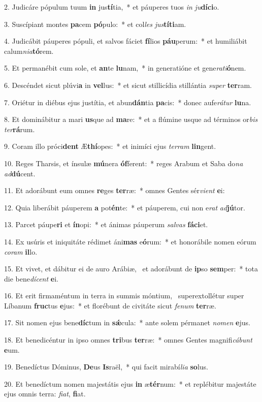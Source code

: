 2. Judicáre pópulum tuum \textbf{in} jus\textbf{tí}tia,~*  et páuperes tuos \textit{in} \textit{ju}\textbf{dí}\textbf{ci}o.\

3. Suscípiant montes \textbf{pa}cem \textbf{pó}pulo:~*  et col\textit{les} \textit{jus}\textbf{tí}\textbf{ti}am.\

4. Judicábit páuperes pópuli, et salvos fáciet \textbf{fí}lios \textbf{páu}perum:~*  et humiliábit calum\textit{ni}\textit{a}\textbf{tó}rem.\

5. Et permanébit cum sole, et \textbf{an}te \textbf{lu}nam,~*  in generatióne et gene\textit{ra}\textit{ti}\textbf{ó}nem.\

6. Descéndet sicut plúvi\textbf{a} in \textbf{vel}lus:~*  et sicut stillicídia stillántia \textit{su}\textit{per} \textbf{ter}ram.\

7. Oriétur in diébus ejus justítia, et abun\textbf{dán}tia \textbf{pa}cis:~*  donec aufe\textit{rá}\textit{tur} \textbf{lu}na.\

8. Et dominábitur a mari \textbf{us}que ad \textbf{ma}re:~*  et a flúmine usque ad términos or\textit{bis} \textit{ter}\textbf{rá}rum.\

9. Coram illo próci\textbf{dent} Æ\textbf{thí}opes:~*  et inimíci ejus \textit{ter}\textit{ram} \textbf{lin}gent.\

10. Reges Tharsis, et ínsulæ \textbf{mú}nera \textbf{óf}ferent:~*  reges Arabum et Saba do\textit{na} \textit{ad}\textbf{dú}cent.\

11. Et adorábunt eum omnes \textbf{re}ges \textbf{ter}ræ:~*  omnes Gentes sér\textit{vi}\textit{ent} \textbf{e}i:\

12. Quia liberábit páuperem \textbf{a} pot\textbf{én}te:~*  et páuperem, cui non e\textit{rat} \textit{ad}\textbf{jú}tor.\

13. Parcet páupe\textbf{ri} et \textbf{ín}opi:~*  et ánimas páuperum \textit{sal}\textit{vas} \textbf{fá}\textbf{ci}et.\

14. Ex usúris et iniquitáte rédimet áni\textbf{mas} e\textbf{ó}rum:~*  et honorábile nomen eórum \textit{co}\textit{ram} \textbf{il}lo.\

15. Et vivet, et dábitur ei de auro Arábiæ, \dag\  et adorábunt de \textbf{ip}so \textbf{sem}per:~*  tota die bene\textit{dí}\textit{cent} \textbf{e}i.\

16. Et erit firmaméntum in terra in summis móntium, \dag\  superextollétur super Líbanum \textbf{fruc}tus \textbf{e}jus:~*  et florébunt de civitáte sicut \textit{fe}\textit{num} \textbf{ter}ræ.\

17. Sit nomen ejus bene\textbf{díc}tum in \textbf{sǽ}cula:~*  ante solem pérmanet \textit{no}\textit{men} \textbf{e}jus.\

18. Et benedicéntur in ipso omnes \textbf{tri}bus \textbf{ter}ræ:~*  omnes Gentes magnifi\textit{cá}\textit{bunt} \textbf{e}um.\

19. Benedíctus Dóminus, \textbf{De}us \textbf{Is}raël,~*  qui facit mirabí\textit{li}\textit{a} \textbf{so}lus.\

20. Et benedíctum nomen majestátis ejus \textbf{in} æ\textbf{tér}num:~*  et replébitur majestáte ejus omnis terra: \textit{fi}\textit{at}, \textbf{fi}at.\

